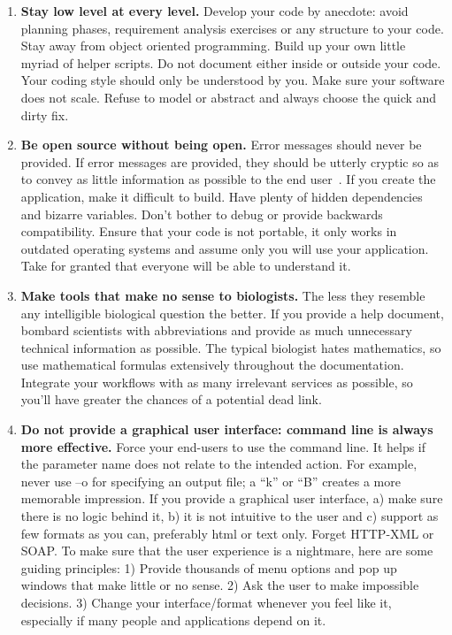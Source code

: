 \documentclass[11pt,twoside,a4paper]{article}
\begin{document}
\begin{enumerate}
	\item \textbf{Stay low level at every level. } Develop your code by anecdote: avoid planning phases, requirement analysis exercises or any structure to your code. Stay away from object oriented programming. Build up your own little myriad of helper scripts. Do not document either inside or outside your code. Your coding style should only be understood by you. Make sure your software does not scale. Refuse to model or abstract and always choose the quick and dirty fix.
	\item \textbf{Be open source without being open. } Error messages should never be provided. If error messages are provided, they should be utterly cryptic so as to convey as little information as possible to the end user~\cite{LawsLawsAndyLaw}. If you create the application, make it difficult to build. Have plenty of hidden dependencies and bizarre variables. Don't bother to debug or provide backwards compatibility. Ensure that your code is not portable, it only works in outdated operating systems and assume only you will use your application. Take for granted that everyone will be able to understand it.
	\item \textbf{Make tools that make no sense to biologists. } The less they resemble any intelligible biological question the better. If you provide a help document, bombard scientists with abbreviations and provide as much unnecessary technical information as possible. The typical biologist hates mathematics, so use mathematical formulas extensively throughout the documentation. Integrate your workflows with as many irrelevant services as possible, so you'll have greater the chances of a potential dead link.
	\item \textbf{Do not provide a graphical user interface: command line is always more effective. } Force your end-users to use the command line. It helps if the parameter name does not relate to the intended action. For example, never use –o for specifying an output file; a ``k'' or ``B'' creates a more memorable impression. If you provide a graphical user interface, a) make sure there is no logic behind it, b) it is not intuitive to the user and c) support as few formats as you can, preferably html or text only. Forget HTTP-XML or SOAP. To make sure that the user experience is a nightmare, here are some guiding principles: 1) Provide thousands of menu options and pop up windows that make little or no sense. 2) Ask the user to make impossible decisions. 3) Change your interface/format whenever you feel like it, especially if many people and applications depend on it.

\end{enumerate}
\end{document}
